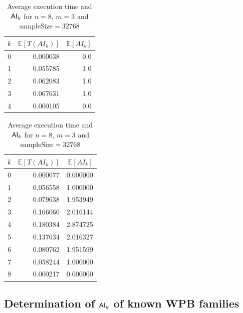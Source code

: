 \documentclass[11pt]{llncs}
\begin{document}
\begin{table}[ht]
    \centering
\begin{minipage}{0.45\textwidth}
    \centering
    \begin{tabular}{rrr}
        \toprule
        $k$ &  $\mathbb{E}[T(AI_k)]$ &  $\mathbb{E}[AI_k]$ \\
        \midrule
        0 &               0.000038 &                 0.0 \\
        1 &               0.055785 &                 1.0 \\
        2 &               0.062083 &                 1.0 \\
        3 &               0.067631 &                 1.0 \\
        4 &               0.000105 &                 0.0 \\
        \bottomrule
    \end{tabular}
    \caption{Average execution time and $\mathsf{AI}_{k}$ for $n=4$, $m=2$}
    \label{table:averagesFullDist}
\end{minipage}
\hfill
\begin{minipage}{0.45\textwidth}
        \centering
        \begin{tabular}{rrr}
\toprule
 $k$ &  $\mathbb{E}[T(AI_k)]$ &  $\mathbb{E}[AI_k]$ \\
\midrule
   0 &               0.000077 &            0.000000 \\
   1 &               0.056558 &            1.000000 \\
   2 &               0.079638 &            1.953949 \\
   3 &               0.166060 &            2.016144 \\
   4 &               0.180384 &            2.874725 \\
   5 &               0.137634 &            2.016327 \\
   6 &               0.080762 &            1.951599 \\
   7 &               0.058244 &            1.000000 \\
   8 &               0.000217 &            0.000000 \\
\bottomrule
\end{tabular}
        \caption{Average execution time and $\mathsf{AI}_{k}$ for $n=8$, $m=3$ and $\mbox{sampleSize}=32768$}
        \label{table:averages32768}
    \end{minipage}
\end{table}

\subsection{Determination of $\mathsf{AI}_{k}$ of known WPB families}
\end{document}
